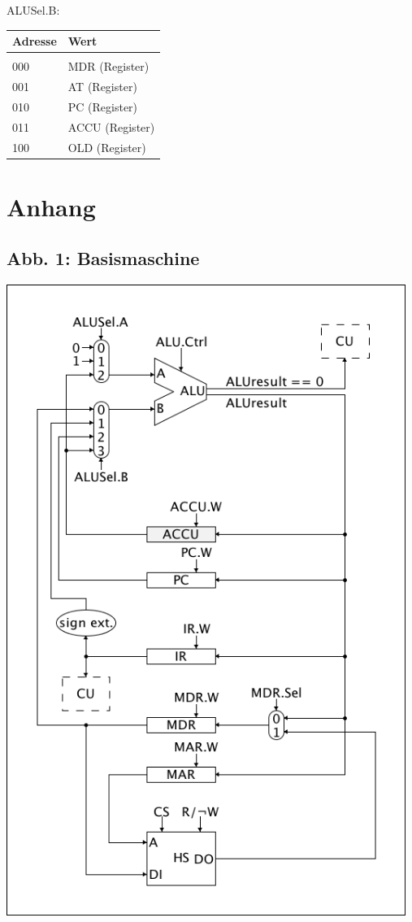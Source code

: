 \documentclass[12pt,titlepage]{article}
\begin{document}
ALUSel.B:

\begin{table}
    \begin{tabular}{l|l}
    Adresse & Wert            \\
    \hline                    \\
    000     & MDR (Register)  \\
    001     & AT (Register)   \\
    010     & PC (Register)   \\
    011     & ACCU (Register) \\
    100     & OLD (Register)  \\
    \end{tabular}
\end{table}


\section{Anhang}

\subsection{Abb. 1: Basismaschine}
\includegraphics[width=13cm]{schematics.png}
\end{document}
